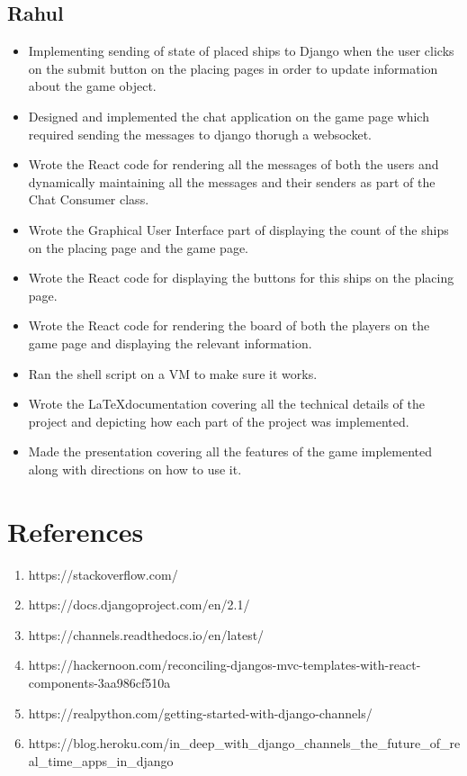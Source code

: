 \documentclass[titlepage]{article}
\begin{document}
\subsection{Rahul}
    \begin{itemize}
        \item Implementing sending of state of placed ships to Django when the user clicks on the submit button on the placing pages in order to update information about the game object.
        \item Designed and implemented the chat application on the game page which required sending the messages to django thorugh a websocket.
        \item Wrote the React code for rendering all the messages of both the users and dynamically maintaining all the messages and their senders as part of the Chat Consumer class.
        \item Wrote the Graphical User Interface part of displaying the count of the ships on the placing page and the game page.
        \item Wrote the React code for displaying the buttons for this ships on the placing page.
        \item Wrote the React code for rendering the board of both the players on the game page and displaying the relevant information.
        \item Ran the shell script on a VM to make sure it works.
        \item Wrote the \LaTeX\space documentation covering all the technical details of the project and depicting how each part of the project was implemented.
        \item Made the presentation covering all the features of the game implemented along with directions on how to use it.
    \end{itemize}

\section{References}
\begin{enumerate}
    \item https://stackoverflow.com/
    \item https://docs.djangoproject.com/en/2.1/
    \item https://channels.readthedocs.io/en/latest/
    \item https://hackernoon.com/reconciling-djangos-mvc-templates-with-react-components-3aa986cf510a
    \item https://realpython.com/getting-started-with-django-channels/
    \item https://blog.heroku.com/in\_deep\_with\_django\_channels\_the\_future\_of\_real\_time\_apps\_in\_django
\end{enumerate}
\end{document}
